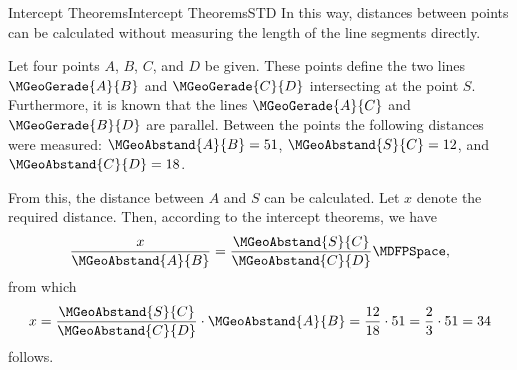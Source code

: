 \begin{MXContent}{Intercept Theorems}{Intercept Theorems}{STD}
In this way, distances between points can be calculated without 
measuring the length of the line segments directly.

\begin{MExample}
Let four points $A$, $B$, $C$, and $D$ be given. These points define the
two lines $\MGeoGerade{A}{B}$ and $\MGeoGerade{C}{D}$ intersecting at the point $S$. 
Furthermore, it is known that the lines $\MGeoGerade{A}{C}$ and $\MGeoGerade{B}{D}$ 
are parallel. Between the points the following distances were measured: 
$\MGeoAbstand{A}{B} = 51$, $\MGeoAbstand{S}{C} = 12 $, and 
$\MGeoAbstand{C}{D} = 18$.

\begin{center}
\end{center}

From this, the distance between $A$ and $S$ can be calculated. Let $x$ denote the 
required distance. Then, according to the intercept theorems, we have
\[
   \frac{x}{\MGeoAbstand{A}{B}}
 = \frac{\MGeoAbstand{S}{C}}{\MGeoAbstand{C}{D}} \MDFPSpace,
\]
from which
\[
x = \frac{\MGeoAbstand{S}{C}}{\MGeoAbstand{C}{D}} \cdot \MGeoAbstand{A}{B} %
 = \frac{12}{18} \cdot 51 = \frac{2}{3} \cdot 51 = 34 %
\]
follows.
\end{MExample}
\end{MXContent}


